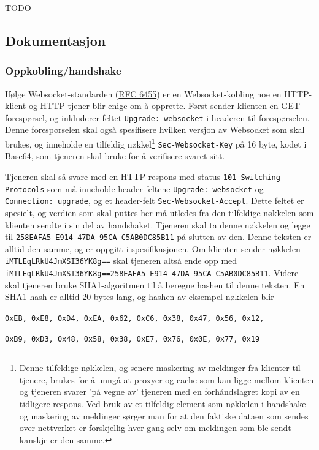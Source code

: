 \documentclass{article}
\newcommand{\code}[1]{\colorbox{light-gray}{\texttt{#1}}}
\begin{document}
TODO

\subsection{Dokumentasjon}
\subsubsection{Oppkobling/handshake}

Ifølge Websocket-standarden (\href{https://www.rfc-editor.org/rfc/rfc6455.html}{RFC 6455}) er en Websocket-kobling noe en HTTP-klient og HTTP-tjener blir enige om å opprette. Først sender klienten en GET-forespørsel, og inkluderer feltet \code{Upgrade: websocket} i headeren til forespørselen. Denne forespørselen skal også spesifisere hvilken versjon av Websocket som skal brukes, og inneholde en tilfeldig nøkkel\footnote{Denne tilfeldige nøkkelen, og senere maskering av meldinger fra klienter til tjenere, brukes for å unngå at proxyer og cache som kan ligge mellom klienten og tjeneren svarer 'på vegne av' tjeneren med en forhåndslagret kopi av en tidligere respons. Ved bruk av et tilfeldig element som nøkkelen i handshake og maskering av meldinger sørger man for at den faktiske dataen som sendes over nettverket er forskjellig hver gang selv om meldingen som ble sendt kanskje er den samme.} \code{Sec-Websocket-Key} på 16 byte, kodet i Base64, som tjeneren skal bruke for å verifisere svaret sitt.

Tjeneren skal så svare med en HTTP-respons med status \code{101 Switching Protocols} som må inneholde header-feltene \code{Upgrade: websocket} og \code{Connection: upgrade}, og et header-felt \code{Sec-Websocket-Accept}. Dette feltet er spesielt, og verdien som skal puttes her må utledes fra den tilfeldige nøkkelen som klienten sendte i sin del av handshaket. Tjeneren skal ta denne nøkkelen og legge til \code{258EAFA5-E914-47DA-95CA-C5AB0DC85B11} på slutten av den. Denne teksten er alltid den samme, og er oppgitt i spesifikasjonen. Om klienten sender nøkkelen \code{iMTLEqLRkU4JmXSI36YK8g==} skal tjeneren altså ende opp med \code{iMTLEqLRkU4JmXSI36YK8g==258EAFA5-E914-47DA-95CA-C5AB0DC85B11}. Videre skal tjeneren bruke SHA1-algoritmen til å beregne hashen til denne teksten. En SHA1-hash er alltid 20 bytes lang, og hashen av eksempel-nøkkelen blir

\begin{center}
    \code{0xEB, 0xE8, 0xD4, 0xEA, 0x62, 0xC6, 0x38, 0x47, 0x56, 0x12,}
    
    \code{0xB9, 0xD3, 0x48, 0x58, 0x38, 0xE7, 0x76, 0x0E, 0x77, 0x19 }
\end{center}
\end{document}
